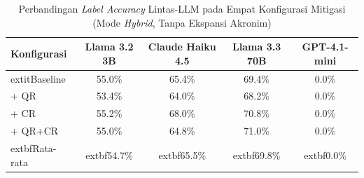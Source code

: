 \begin{table}[H]
\centering
\caption{Perbandingan \textit{Label Accuracy} Lintas-LLM pada Empat Konfigurasi Mitigasi (Mode \textit{Hybrid}, Tanpa Ekspansi Akronim)}
\label{tbl:xllm-comparison}
\begin{tabular}{|l|c|c|c|c|}
\hline
\textbf{Konfigurasi} & \textbf{Llama 3.2 3B} & \textbf{Claude Haiku 4.5} & \textbf{Llama 3.3 70B} & \textbf{GPT-4.1-mini} \\ \hline
	extit{Baseline} & 55.0\% & 65.4\% & 69.4\% & 0.0\% \\ \hline
+ QR & 53.4\% & 64.0\% & 68.2\% & 0.0\% \\ \hline
+ CR & 55.2\% & 68.0\% & 70.8\% & 0.0\% \\ \hline
+ QR+CR & 55.0\% & 64.8\% & 71.0\% & 0.0\% \\ \hline
	extbf{Rata-rata} & 	extbf{54.7\%} & 	extbf{65.5\%} & 	extbf{69.8\%} & 	extbf{0.0\%} \\ \hline
\end{tabular}
\end{table}
